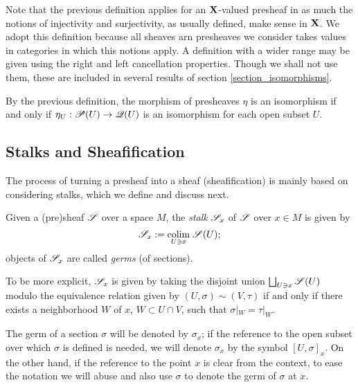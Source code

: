 \begin{obs}
Note that the previous definition applies for an ${\bf X}$-valued presheaf in as much the notions of injectivity and surjectivity, as usually defined, make sense in ${\bf X}$. We adopt this definition because all sheaves arn presheaves we consider takes values in categories in which this notions apply. A definition with a wider range may be given using the right and left cancellation properties. Though we shall not use them, these are included in several results of section \ref{section_isomorphisms}.
\end{obs}

By the previous definition, the morphism of presheaves $\eta$ is an isomorphism if and only if $\eta_U:\mathscr{P}(U)\to \mathscr{Q}(U)$ is an isomorphism for each open subset $U$.


\subsection{Stalks and Sheafification}

The process of turning a presheaf into a sheaf (sheafification) is mainly based on considering stalks, which we define and discuss next.

\begin{defi}
Given a (pre)sheaf $\mathscr{S}$ over a space $M$, the \emph{stalk} $\mathscr{S}_x$ of $\mathscr{S}$ over $x\in M$ is given by
$$\mathscr{S}_x:=\underset{U\ni x}{\operatorname{colim}}\; \mathscr{S}(U);$$
objects of $\mathscr{S}_x$ are called \emph{germs} (of sections).
\end{defi}

To be more explicit, $\mathscr{S}_x$ is given by taking the disjoint union $\bigsqcup_{U\ni x}\mathscr{S}(U)$ modulo the equivalence relation given by $(U,\sigma )\sim (V,\tau )$ if and only if there exists a neighborhood $W$ of $x$, $W\subset U\cap V$, such that $\sigma|_W=\tau|_W$.

\begin{notation}
The germ of a section $\sigma$ will be denoted by $\sigma_x$; if the reference to the open subset over which $\sigma$ is defined is needed, we will denote $\sigma_x$ by the symbol $[U,\sigma ]_x$. On the other hand, if the reference to the point $x$ is clear from the context, to ease the notation we will abuse and also use $\sigma$ to denote the germ of $\sigma$ at $x$.
\end{notation}

